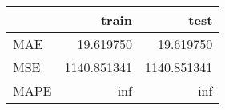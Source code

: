 \begin{tabular}{lrr}
\toprule
{} &        train &         test \\
\midrule
MAE  &    19.619750 &    19.619750 \\
MSE  &  1140.851341 &  1140.851341 \\
MAPE &          inf &          inf \\
\bottomrule
\end{tabular}
